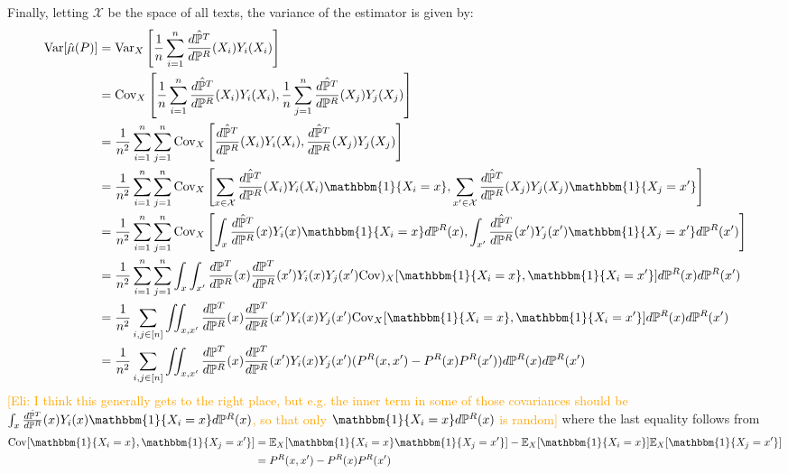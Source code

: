 \documentclass{article}
\newcommand{\eli}[1]{\textcolor{orange}{[Eli: #1]}}
\begin{document}
Finally, letting $\mathcal{X}$ be the space of all texts, the variance of the estimator is given by:
\begin{align*}
    \text{Var}[\hat{\mu}(P)] &= \text{Var}_X\left[\frac{1}{n} \sum_{i=1}^n \frac{\hat{d \mathbb{P}^T}}{d \mathbb{P}^R}(X_i)Y_i(X_i)\right] \\
    &= \text{Cov}_X\left[\frac{1}{n} \sum_{i=1}^n \frac{\hat{d \mathbb{P}^T}}{d \mathbb{P}^R}(X_i)Y_i(X_i), \frac{1}{n} \sum_{j=1}^n \frac{\hat{d \mathbb{P}^T}}{d \mathbb{P}^R}(X_j)Y_j(X_j)\right] \\
    &= \frac{1}{n^2}\sum_{i=1}^n \sum_{j=1}^n \text{Cov}_X\left[\frac{\hat{d \mathbb{P}^T}}{d \mathbb{P}^R}(X_i)Y_i(X_i), \frac{\hat{d \mathbb{P}^T}}{d \mathbb{P}^R}(X_j)Y_j(X_j)\right] \\
    &= \frac{1}{n^2}\sum_{i=1}^n \sum_{j=1}^n \text{Cov}_X\left[\sum_{x \in \mathcal{X}}\frac{\hat{d \mathbb{P}^T}}{d \mathbb{P}^R}(X_i)Y_i(X_i)\mathbbm{1}\{X_i = x\}, \sum_{x' \in \mathcal{X}}\frac{\hat{d \mathbb{P}^T}}{d \mathbb{P}^R}(X_j)Y_j(X_j)\mathbbm{1}\{X_j=x'\}\right] \\
    &= \frac{1}{n^2}\sum_{i=1}^n \sum_{j=1}^n \text{Cov}_X\left[\int_x\frac{\hat{d \mathbb{P}^T}}{d \mathbb{P}^R}(x)Y_i(x)\mathbbm{1}\{X_i = x\}d\mathbb{P}^R(x), \int_{x'}\frac{\hat{d \mathbb{P}^T}}{d \mathbb{P}^R}(x')Y_j(x')\mathbbm{1}\{X_j=x'\}d\mathbb{P}^R(x')\right] \\
    &= \frac{1}{n^2} \sum_{i=1}^n \sum_{j=1}^n \int_x \int_{x'} \frac{d \mathbb{P}^T}{d \mathbb{P}^R}(x)\frac{d \mathbb{P}^T}{d \mathbb{P}^R}(x')Y_i(x)Y_j(x') \text{Cov})_X[\mathbbm{1}\{X_i=x\}, \mathbbm{1}\{X_i=x'\}]d\mathbb{P}^R(x)d\mathbb{P}^R(x') \\
    &= \frac{1}{n^2} \sum_{i,j \in [n]} \iint_{x, x'} \frac{d \mathbb{P}^T}{d \mathbb{P}^R}(x)\frac{d \mathbb{P}^T}{d \mathbb{P}^R}(x')Y_i(x)Y_j(x') \text{Cov}_X[\mathbbm{1}\{X_i=x\}, \mathbbm{1}\{X_i=x'\}]d\mathbb{P}^R(x)d\mathbb{P}^R(x') \\
    &= \frac{1}{n^2} \sum_{i,j \in [n]} \iint_{x, x'} \frac{d \mathbb{P}^T}{d \mathbb{P}^R}(x)\frac{d \mathbb{P}^T}{d \mathbb{P}^R}(x')Y_i(x)Y_j(x') (P^R(x,x') - P^R(x)P^R(x'))d\mathbb{P}^R(x)d\mathbb{P}^R(x')
\end{align*}
\eli{I think this generally gets to the right place, but e.g. the inner term in some of those covariances should be $\int_x\frac{\hat{d \mathbb{P}^T}}{d \mathbb{P}^R}(x)Y_i(x)\mathbbm{1}\{X_i = x\}d\mathbb{P}^R(x)$, so that only $\mathbbm{1}\{X_i = x\}d\mathbb{P}^R(x)$ is random}
where the last equality follows from
\begin{align*}
    \text{Cov}[\mathbbm{1}\{X_i=x\},\mathbbm{1}\{X_j=x'\}] &=\mathbb{E}_X[\mathbbm{1}\{X_i=x\}\mathbbm{1}\{X_j=x'\}] - \mathbb{E}_X[\mathbbm{1}\{X_i=x\}]\mathbb{E}_X[\mathbbm{1}\{X_j=x'\}] \\
    &= P^R(x,x') - P^R(x)P^R(x')
\end{align*}
\end{document}
